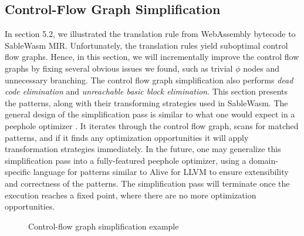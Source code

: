 \subsection{Control-Flow Graph Simplification}

In section 5.2, we illustrated the translation rule from WebAssembly bytecode to
SableWasm MIR. Unfortunately, the translation rules yield suboptimal control
flow graphs. Hence, in this section, we will incrementally improve the control
flow graphs by fixing several obvious issues we found, such as trivial $\phi$
nodes and unnecessary branching. The control flow graph simplification also
performs \emph{dead code elimination} and \emph{unreachable basic block
    elimination}. This section presents the patterns, along with their
transforming strategies used in SableWasm. The general design of the
simplification pass is similar to what one would expect in a peephole optimizer
\cite{peephole-opt}. It iterates through the control flow graph, scans for
matched patterns, and if it finds any optimization opportunities it will apply
transformation strategies immediately. In the future, one may generalize this
simplification pass into a fully-featured peephole optimizer, using a
domain-specific language for patterns similar to Alive
\cite{alive, alive-in-lean} for LLVM to ensure extensibility and correctness of
the patterns. The simplification pass will terminate once the execution reaches
a fixed point, where there are no more optimization opportunities.

\begin{figure}
    \begin{minipage}[t]{.5\textwidth}
        
    \end{minipage}\hfill
    \begin{minipage}[t]{.5\textwidth}
        
    \end{minipage}
    \caption{Control-flow graph simplification example}
    \label{fig:simplify-example}
\end{figure}

